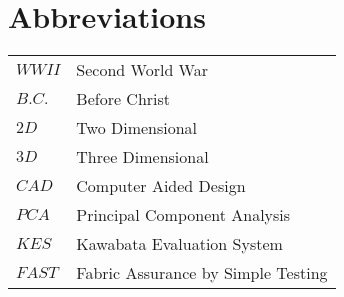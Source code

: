 
\ifx\isEmbedded\undefined


\fi

\pagebreak


\chapter*{Abbreviations}


\begin{longtable}{ m{20mm}|m{90mm} }

  $WWII$ & Second World War\\
  $B.C.$ & Before Christ\\
  $2D$ & Two Dimensional \\ 
  $3D$ & Three Dimensional \\
  $CAD$ & Computer Aided Design\\
  $PCA$ & Principal Component Analysis\\
  $KES$ & Kawabata Evaluation System\\
  $FAST$ & Fabric Assurance by Simple Testing\\

\end{longtable}


\ifx\isEmbedded\undefined


\pagebreak

\fi






